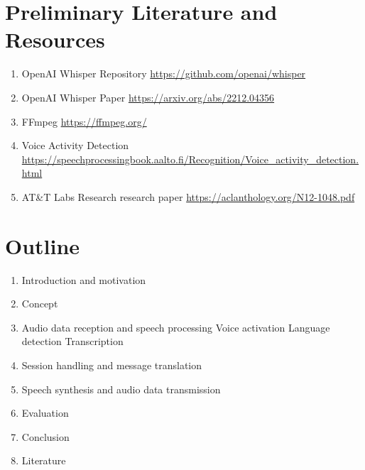 \documentclass[a4paper,10pt]{article}
\begin{document}
\section{Preliminary Literature and Resources}
\begin{enumerate}
  \item OpenAI Whisper Repository \url{https://github.com/openai/whisper}
  \item OpenAI Whisper Paper \url{https://arxiv.org/abs/2212.04356}
  \item FFmpeg \url{https://ffmpeg.org/}
  \item Voice Activity Detection \url{https://speechprocessingbook.aalto.fi/Recognition/Voice_activity_detection.html}
  \item AT\&T Labs Research research paper \url{https://aclanthology.org/N12-1048.pdf}
\end{enumerate}


\section{Outline}
\begin{enumerate}
  \item Introduction and motivation
  \item Concept
  \item Audio data reception and speech processing
  \subitem Voice activation
  \subitem Language detection
  \subitem Transcription
  \item Session handling and message translation
  \item Speech synthesis and audio data transmission
  \item Evaluation
  \item Conclusion
  \item Literature
\end{enumerate}
\end{document}
